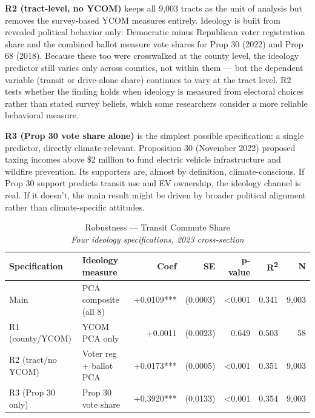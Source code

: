 \documentclass[12pt]{article}
\begin{document}
\textbf{R2 (tract-level, no YCOM)} keeps all 9,003 tracts as the unit of analysis but
removes the survey-based YCOM measures entirely. Ideology is built from revealed political
behavior only: Democratic minus Republican voter registration share and the combined ballot
measure vote shares for Prop 30 (2022) and Prop 68 (2018). Because these too were
crosswalked at the county level, the ideology predictor still varies only across counties,
not within them --- but the dependent variable (transit or drive-alone share) continues to
vary at the tract level. R2 tests whether the finding holds when ideology is measured
from electoral choices rather than stated survey beliefs, which some researchers consider
a more reliable behavioral measure.

\textbf{R3 (Prop 30 vote share alone)} is the simplest possible specification: a single
predictor, directly climate-relevant. Proposition 30 (November 2022) proposed taxing
incomes above \$2 million to fund electric vehicle infrastructure and wildfire prevention.
Its supporters are, almost by definition, climate-conscious. If Prop 30 support predicts
transit use and EV ownership, the ideology channel is real. If it doesn't, the main result
might be driven by broader political alignment rather than climate-specific attitudes.

\begin{table}[H]
\centering
\caption{Robustness --- Transit Commute Share\\
\small\textit{Four ideology specifications, 2023 cross-section}}
\small
\begin{tabular}{p{3.0cm}p{3.8cm}rrrr r}
\toprule
Specification & Ideology measure & Coef & SE & p-value & R\textsuperscript{2} & N \\
\midrule
Main             & PCA composite (all 8)  & +0.0109*** & (0.0003) & <0.001 & 0.341 & 9,003 \\
R1 (county/YCOM) & YCOM PCA only          & +0.0011    & (0.0023) & 0.649  & 0.503 &    58 \\
R2 (tract/no YCOM) & Voter reg + ballot PCA & +0.0173*** & (0.0005) & <0.001 & 0.351 & 9,003 \\
R3 (Prop 30 only)  & Prop 30 vote share   & +0.3920*** & (0.0133) & <0.001 & 0.354 & 9,003 \\
\bottomrule
\end{tabular}
\normalsize
\end{table}
\end{document}
